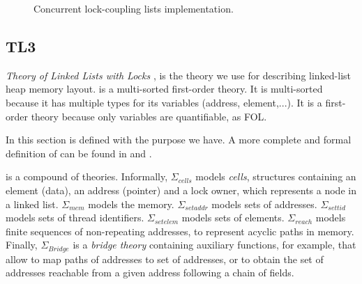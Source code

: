 \begin{figure}[!htbp]
		\caption{ Concurrent lock-coupling lists implementation.}
		\label{fig:listcode}
\end{figure}


\subsection{TL3}

\emph{Theory of Linked Lists with Locks} \TLLpL, is the theory we use for describing linked-list heap memory layout.
%
\TLLpL is a multi-sorted first-order theory.
%
It is multi-sorted because it has multiple types for its variables (address, element,...).
%
It is a first-order theory because only variables are quantifiable, as \gls{FOL}.

In this section \TLLpL is defined with the purpose we have. 
%
A more complete and formal definition of \TLLpL can be found in  and \citep[6.2]{thesisAle}.


\TLLpL is a compound of theories. Informally,  
$\Sigma_{cells}$ models \emph{cells}, structures containing an element (data), an address (pointer) and a lock owner, which represents a node in a linked list.
%
$\Sigma_{mem}$ models the memory.
%
$\Sigma_{setaddr}$ models sets of addresses.
%
$\Sigma_{settid}$ models sets of thread identifiers.
%
$\Sigma_{setelem}$ models sets of elements.
%
$\Sigma_{reach}$ models finite sequences of non-repeating addresses,
to represent acyclic paths in memory.
%
Finally, $\Sigma_{Bridge}$ is a \emph{bridge theory} containing auxiliary
functions, for example, that allow to map paths of addresses to set of 
addresses, or to obtain the set of addresses reachable from a given 
address following a chain of \fNext fields.

